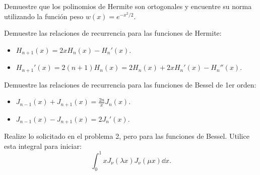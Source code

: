 \begin{ejercicio}
	Demuestre que los polinomios de Hermite son ortogonales y encuentre su norma utilizando la función peso $w(x) = e^{-x^2 /2}$.
\end{ejercicio}














\begin{ejercicio}
	Demuestre las relaciones de recurrencia para las funciones de Hermite:
	\begin{itemize}
		\item $H_{n + 1} (x) = 2xH_n (x) - H_n ' (x)$.
		\item $H_{n + 1} ' (x) = 2(n + 1) H_n (x) = 2H_n (x) + 2xH_n ' (x) - H_n '' (x)$.
	\end{itemize}
\end{ejercicio}













\begin{ejercicio}
	Demuestre las relaciones de recurrencia para las funciones de Bessel de 1er orden:
	\begin{itemize}
		\item $J_{n - 1} (x) + J_{n + 1} (x) = \frac{2n}{x} J_n (x)$.
		\item $J_{n - 1} (x) - J_{n + 1} (x) = 2J_n ' (x)$.
	\end{itemize}
\end{ejercicio}












\begin{ejercicio}
	Realize lo solicitado en el problema 2, pero para las funciones de Bessel. Utilice esta integral para iniciar:
		$$ \int _0 ^1 x J_\nu (\lambda x) J_\nu (\mu x) \dd{x}. $$
\end{ejercicio}




















